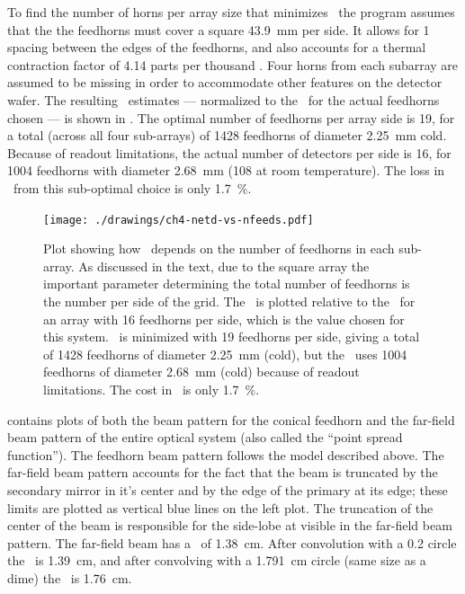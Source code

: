 To find the number of horns per array size that minimizes \NETD\, the program assumes that the the feedhorns must cover a square \SI{43.9}{\mm} per side.
It allows for \SI{1}{\mil} spacing between the edges of the feedhorns, and also accounts for a thermal contraction factor of 4.14 parts per thousand \cite[Appendix~A6.4]{ekin_experimental_2006}.
Four horns from each subarray are assumed to be missing in order to accommodate other features on the detector wafer.
The resulting \NETD\ estimates --- normalized to the \NETD\ for the actual feedhorns chosen --- is shown in .
The optimal number of feedhorns per array side is 19, for a total (across all four sub-arrays) of 1428 feedhorns of diameter \SI{2.25}{\mm} cold.
Because of readout limitations, the actual number of detectors per side is 16, for 1004 feedhorns with diameter \SI{2.68}{\mm} (\SI{108}{\mils} at room temperature).
The loss in \NETD\ from this sub-optimal choice is only \SI{1.7}{\percent}.

\begin{figure}
\centering
\texttt{[image: ./drawings/ch4-netd-vs-nfeeds.pdf]}
\caption[\NETD\ vs number of detectors]{
  Plot showing how \NETD\ depends on the number of feedhorns in each sub-array.
  As discussed in the text, due to the square array the important parameter determining the total number of feedhorns is the number per side of the grid.
  The \NETD\ is plotted relative to the \NETD\ for an array with 16 feedhorns per side, which is the value chosen for this system.
  \NETD\ is minimized with 19 feedhorns per side, giving a total of 1428 feedhorns of diameter \SI{2.25}{\mm} (cold), but the \Imager\ uses 1004 feedhorns of diameter \SI{2.68}{\mm} (cold) because of readout limitations.
  The cost in \NETD\ is only \SI{1.7}{\percent}.
}
\label{fig:ch4-netd-vs-nfeeds}
\end{figure}


 contains plots of both the beam pattern for the conical feedhorn and the far-field beam pattern of the entire optical system (also called the ``point spread function'').
The feedhorn beam pattern follows the model described above.
The far-field beam pattern accounts for the fact that the beam is truncated by the secondary mirror in it's center and by the edge of the primary at its edge; these limits are plotted as vertical blue lines on the left plot.
The truncation of the center of the beam is responsible for the side-lobe at  visible in the far-field beam pattern.
The far-field beam has a \FWHM\ of \SI{1.38}{\cm}.
After convolution with a \SI{0.2}{\in} circle the \FWHM\ is \SI{1.39}{\cm}, and after convolving with a \SI{1.791}{\cm} circle (same size as a dime) the \FWHM\ is \SI{1.76}{\cm}.

